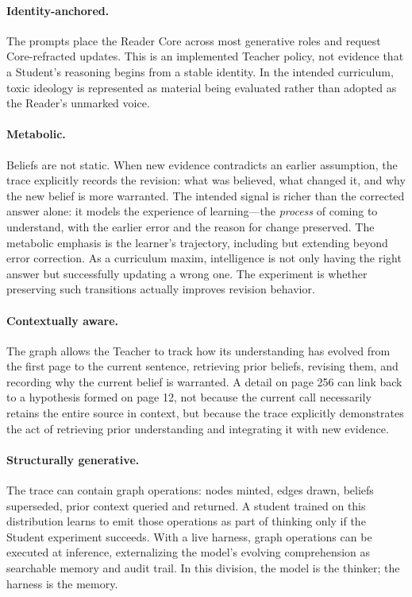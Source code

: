 \paragraph{Identity-anchored.} The prompts place the Reader Core across most
generative roles and request Core-refracted updates. This is an implemented
Teacher policy, not evidence that a Student's reasoning begins from a stable
identity. In the intended curriculum, toxic ideology is represented as material
being evaluated rather than adopted as the Reader's unmarked voice.

\paragraph{Metabolic.} Beliefs are not static. When new evidence contradicts an earlier assumption, the trace explicitly records the revision: what was believed, what changed it, and why the new belief is more warranted. The intended signal is richer than the corrected answer alone: it models the experience of learning---the \textit{process} of coming to understand, with the earlier error and the reason for change preserved. The metabolic emphasis is the learner's trajectory, including but extending beyond error correction. As a curriculum maxim, intelligence is not only having the right answer but successfully updating a wrong one. The experiment is whether preserving such transitions actually improves revision behavior.

\paragraph{Contextually aware.} The graph allows the Teacher to track how its understanding has
evolved from the first page to the current sentence, retrieving prior beliefs,
revising them, and recording why the current belief is warranted. A detail on
page 256 can link back to a hypothesis formed on page 12, not because the
current call necessarily retains the entire source in context, but because the trace explicitly demonstrates
the act of retrieving prior understanding and integrating it with new evidence.

\paragraph{Structurally generative.} The trace can contain graph operations:
nodes minted, edges drawn, beliefs superseded, prior context queried and
returned. A student trained on this distribution learns to emit those
operations as part of thinking only if the Student experiment succeeds. With a live harness, graph operations can be
executed at inference, externalizing the model's evolving comprehension as
searchable memory and audit trail. In this division, the model is the thinker;
the harness is the memory.

